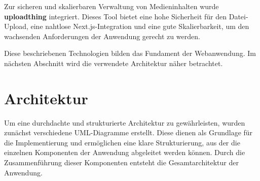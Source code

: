 Zur sicheren und skalierbaren Verwaltung von Medieninhalten wurde \textbf{uploadthing} integriert. Dieses Tool bietet eine hohe Sicherheit für den Datei-Upload, eine 
nahtlose Next.js-Integration und eine gute Skalierbarkeit, um den wachsenden Anforderungen der Anwendung gerecht zu werden.

Diese beschriebenen Technologien bilden das Fundament der Webanwendung. Im nächsten Abschnitt wird die verwendete Architektur näher betrachtet.

\section{Architektur}
\label{sec:chapter2-2}

Um eine durchdachte und strukturierte Architektur zu gewährleisten, wurden zunächst verschiedene \ac{UML}-Diagramme erstellt.
Diese dienen als Grundlage für die Implementierung und ermöglichen eine klare Strukturierung, aus der die einzelnen Komponenten der Anwendung abgeleitet werden können. Durch die 
Zusammenführung dieser Komponenten entsteht die Gesamtarchitektur der Anwendung.


